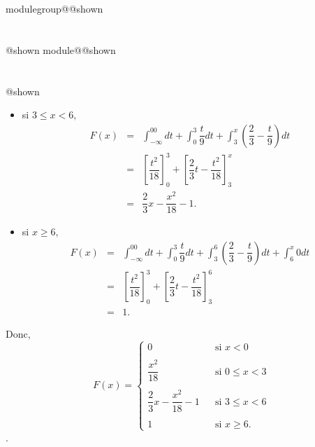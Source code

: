 \documentclass{Evaluation}
\makeatletter
\newcommand{\currentmodulekey}{}
\newcommand{\currentmoduletitle}{}
\newcommand{\currentgroupkey}{}
\newcommand{\currentgrouptitle}{}
\newcommand{\showmoduleifneeded}{%
  \ifx\currentgroupkey\empty\else
    \expandafter\ifx\csname modulegroup@\currentgroupkey @shown\endcsname\relax
      \section*{\currentgrouptitle}%
      \expandafter\gdef\csname modulegroup@\currentgroupkey @shown\endcsname{1}%
    \fi
  \fi
  \expandafter\ifx\csname module@\currentmodulekey @shown\endcsname\relax
    \section*{\currentmoduletitle}%
    \expandafter\gdef\csname module@\currentmodulekey @shown\endcsname{1}%
  \fi
}
\newenvironment{A22}{\showmoduleifneeded}{}
\makeatother
\begin{document}
\begin{questions}
\begin{A22}
\begin{parts}
\begin{solution}
\begin{itemize}
      \item[$\bullet$] si $3 \leq x < 6,$ \begin{eqnarray*}
                                            F(x)    &=&  \int_{-\infty}^00dt + \int_0^3 \dfrac{t}{9}dt + \int_3^x\left(\dfrac{2}{3}-\dfrac{t}{9}\right)dt\\
                                                    &=&  \left[\dfrac{t^2}{18}\right]_0^3 + \left[\dfrac{2}{3}t -\dfrac{t^2}{18}\right]_3^x\\
                                                    &=&  \dfrac{2}{3}x -\dfrac{x^2}{18} -1.
                                   \end{eqnarray*}

      \item[$\bullet$]  si $x \geq 6,$ \begin{eqnarray*}
                                      F(x)      &=&  \int_{-\infty}^00dt + \int_0^3 \dfrac{t}{9}dt + \int_3^6\left(\dfrac{2}{3}-\dfrac{t}{9}\right)dt +\int_6^x0dt\\
                                                &=&  \left[\dfrac{t^2}{18}\right]_0^3 + \left[\dfrac{2}{3}t -\dfrac{t^2}{18}\right]_3^6\\
                                                &=& 1 .
                                   \end{eqnarray*}
    \end{itemize}
   Donc, $$F(x) = \left \{
                \begin{array}{lcl}
                        0                                   & &\text{si } x < 0 \\
                                                            & & \\
                        \dfrac{x^2}{18}                     & &\text{si } 0 \leq x < 3   \\
                                                            & & \\
                        \dfrac{2}{3}x-\dfrac{x^2}{18}-1     & &\text{si } 3 \leq x < 6 \\
                                                            & & \\
                        1                                   & &\text{si } x \geq 6.
                \end{array}
                    \right.$$.
\end{solution}



\end{parts}
\end{A22}
\end{questions}
\end{document}
